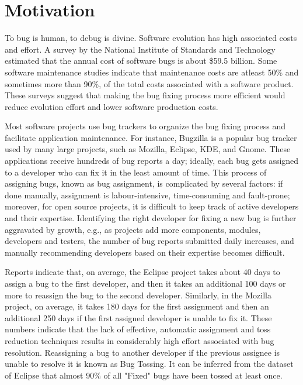 
\chapter{Motivation} %
	To bug is human, to debug is divine. Software evolution has high associated costs and effort. A survey by the National Institute of Standards and Technology estimated that the annual cost of software bugs is about \$59.5 billion. Some software maintenance studies indicate that maintenance costs are atleast 50\% and sometimes more than 90\%, of the total costs associated with a software product. These surveys suggest that making the bug fixing process more efficient would reduce evolution effort and lower software production costs.
	
	Most software projects use bug trackers to organize the bug fixing process and facilitate application maintenance. For instance, Bugzilla is a popular bug tracker used by many large projects, such as Mozilla, Eclipse, KDE, and Gnome. These applications receive hundreds of bug reports a day; ideally, each bug gets assigned to a developer who can fix it in the least amount of time. This process of assigning bugs, known as bug assignment, is complicated by several factors: if done manually, assignment is labour-intensive, time-consuming and fault-prone; moreover, for open source projects, it is difficult to keep track of active developers and their expertise. Identifying the right developer for fixing a new bug is further aggravated by growth, e.g., as projects add more components, modules, developers and testers, the number of bug reports submitted daily increases, and manually recommending developers based on their expertise becomes difficult.
	
	Reports indicate that, on average, the Eclipse project takes about 40 days to assign a bug to the first developer, and then it takes an additional 100 days or more to reassign the bug to the second developer. Similarly, in the Mozilla project, on average, it takes 180 days for the first assignment and then an additional 250 days if the first assigned developer is unable to fix it. These numbers indicate that the lack of effective, automatic assignment and toss reduction techniques results in considerably high effort associated with bug resolution. Reassigning a bug to another developer if the previous assignee is unable to resolve it is known as Bug Tossing. It can be inferred from the dataset of Eclipse that almost 90\% of all "Fixed" bugs have been tossed at least once.

